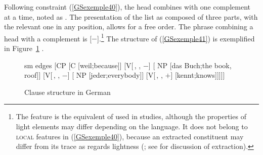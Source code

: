 \begin{exe}
\end{exe}

\noindent
Following constraint (\ref{GSexemple40}), the head combines with one complement at a time, noted as
. The presentation of the list as composed of three parts, with the relevant one in any
position, allows for a free order. The phrase combining a head with a complement is [\light{}$-$].\footnote{The feature \light is the equivalent of \lex used in 
  studies, although the properties of light elements may differ depending on the language. It does
  not belong to \textsc{local} features in (\ref{GSexemple40}), because an extracted constituent may
  differ from its trace as regards lightness (\citealt{Mueller96a,muller2018clause}; see  for discussion of extraction).} The structure of (\ref{GSexemple41}) is exemplified in Figure~\ref{GSfigure10} \citep[22]{muller2018clause}.


\z


\begin{figure}
    \centering
	\begin{forest}
	sm edges
 	[CP 
    [C [weil;because]]
    [{V[\,, \comps \eliste, \light{}$-$]}
        [ NP [das Buch;the book, roof]]    
        [{V[\,, \comps {}, \light{}$-$]} 
            [ NP [jeder;everybody]]
            [{V[\,, \comps {}, \light{}$+$]} [kennt;knows]]]]]
\end{forest}
    \caption{Clause structure in German}
    \label{GSfigure10}
\end{figure}


